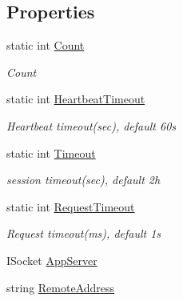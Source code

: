 \subsection*{Properties}
\begin{DoxyCompactItemize}
\item 
static int \mbox{\hyperlink{class_t_net_1_1_contract_1_1_game_session_a911f83049924402e92f0fbf126ea5be3}{Count}}
\begin{DoxyCompactList}\small\item\em Count \end{DoxyCompactList}\item 
static int \mbox{\hyperlink{class_t_net_1_1_contract_1_1_game_session_a51d727aeae11ff9ebb3dface99ec3900}{Heartbeat\+Timeout}}
\begin{DoxyCompactList}\small\item\em Heartbeat timeout(sec), default 60s \end{DoxyCompactList}\item 
static int \mbox{\hyperlink{class_t_net_1_1_contract_1_1_game_session_a5e5ba1d8bcec84365cea3f8af002e047}{Timeout}}
\begin{DoxyCompactList}\small\item\em session timeout(sec), default 2h \end{DoxyCompactList}\item 
static int \mbox{\hyperlink{class_t_net_1_1_contract_1_1_game_session_a4f99e4c3546154849543963fb25ffb96}{Request\+Timeout}}
\begin{DoxyCompactList}\small\item\em Request timeout(ms), default 1s \end{DoxyCompactList}\item 
I\+Socket \mbox{\hyperlink{class_t_net_1_1_contract_1_1_game_session_a9ee24201071d062e841780111bbea753}{App\+Server}}
\item 
string \mbox{\hyperlink{class_t_net_1_1_contract_1_1_game_session_ad03b44148a490d15c8d7247f0c2b44b7}{Remote\+Address}}

\end{DoxyCompactItemize}
